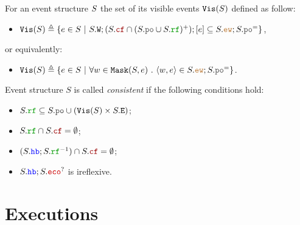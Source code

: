 \documentclass[12pt]{article}
\begin{document}
\begin{definition}
  For an event structure $S$ the set of its visible events ${\mathtt{Vis}}(S)$ defined as follow:
  \begin{itemize}
    \item $\lVIS(\lES) \defeq 
      \{ e \in \lES ~|~ \lES.\lW;(\lES.\lCF \cap (\lES.\lPO \cup \lES.\lRF)^+);[e] \subseteq 
         \lES.\lEW;\lES.\lPO^=
      \}$,
  \end{itemize}
  or equivalently:
  \begin{itemize}
    \item $\lVIS(\lES) \defeq 
      \{ e \in \lES ~|~ \forall{w \in \lMASK(\lES, e)} ~.~ \tup{w, e} \in \lES.\lEW;\lES.\lPO^=\}$.
  \end{itemize}
\end{definition}

\begin{definition}
  Event structure $S$ is called \emph{consistent} if the following conditions hold:
  
  \begin{itemize}

    \item $S.\lRF \subseteq S.\lPO \cup (\lVIS(S) \times S.\lE)$;

    \item $S.\lRF \cap S.\lCF = \emptyset$;

    \item $(S.\lHB;S.\lRF^{-1}) \cap S.\lCF = \emptyset$;

    \item $S.\lHB;S.\lECO^?$ is ireflexive.
  \end{itemize}
\end{definition}

\section{Executions}
\end{document}
